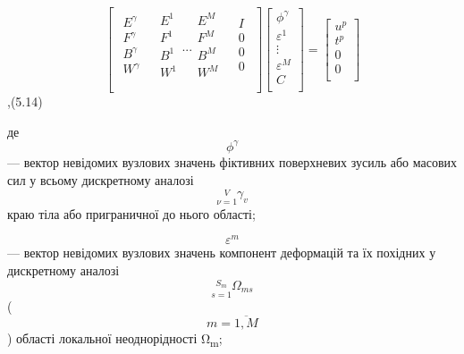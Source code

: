 \[{\begin{bmatrix}
\begin{matrix}
E^{\gamma} \\
F^{\gamma} \\
B^{\gamma} \\
W^{\gamma} \\
\end{matrix} & {\begin{matrix}
E^{1} \\
F^{1} \\
B^{1} \\
W^{1} \\
\end{matrix}\text{.}\text{.}\text{.}\begin{matrix}
E^{M} \\
F^{M} \\
B^{M} \\
W^{M} \\
\end{matrix}} & \begin{matrix}
I \\
0 \\
0 \\
0 \\
\end{matrix} \\
\end{bmatrix}{\begin{bmatrix}
\phi^{\gamma} \\
\varepsilon^{1} \\
 \vdots \\
\varepsilon^{M} \\
C \\
\end{bmatrix} = \begin{bmatrix}
u^{p} \\
t^{p} \\
0 \\
0 \\
\end{bmatrix}}}{}\],(5.14)

де \[\phi^{\gamma}{}\] --- вектор невідомих вузлових значень фіктивних
поверхневих зусиль або масових сил у всьому дискретному аналозі
\[{\underset{\nu = 1}{\overset{V}{}}\gamma_{v}}{}\] краю тіла або
приграничної до нього області;

\[\varepsilon^{m}{}\] --- вектор невідомих вузлових значень компонент
деформацій та їх похідних у дискретному аналозі
\[{\underset{s = 1}{\overset{S_{m}}{}}\Omega_{\mathit{\text{ms}}}}{}\]
(\[{m = \overline{1,M}}{}\]) області локальної неоднорідності
Ω\textsubscript{m};

